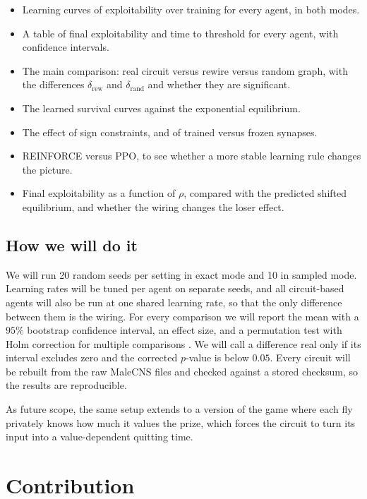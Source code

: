 \documentclass{article}
\begin{document}
\begin{itemize}
  \item Learning curves of exploitability over training for every agent, in both modes.
  \item A table of final exploitability and time to threshold for every agent, with confidence intervals.
  \item The main comparison: real circuit versus rewire versus random graph, with the differences $\delta_{\mathrm{rew}}$ and $\delta_{\mathrm{rand}}$ and whether they are significant.
  \item The learned survival curves against the exponential equilibrium.
  \item The effect of sign constraints, and of trained versus frozen synapses.
  \item REINFORCE versus PPO, to see whether a more stable learning rule changes the picture.
  \item Final exploitability as a function of $\rho$, compared with the predicted shifted equilibrium, and whether the wiring changes the loser effect.
\end{itemize}

\subsection{How we will do it}

We will run 20 random seeds per setting in exact mode and 10 in sampled mode. Learning rates will be tuned per agent on separate seeds, and all circuit-based agents will also be run at one shared learning rate, so that the only difference between them is the wiring. For every comparison we will report the mean with a $95\%$ bootstrap confidence interval, an effect size, and a permutation test with Holm correction for multiple comparisons \citep{holm1979}. We will call a difference real only if its interval excludes zero and the corrected $p$-value is below $0.05$. Every circuit will be rebuilt from the raw MaleCNS files and checked against a stored checksum, so the results are reproducible.

As future scope, the same setup extends to a version of the game where each fly privately knows how much it values the prize, which forces the circuit to turn its input into a value-dependent quitting time.

\section{Contribution}
\label{sec:contrib}
\end{document}
